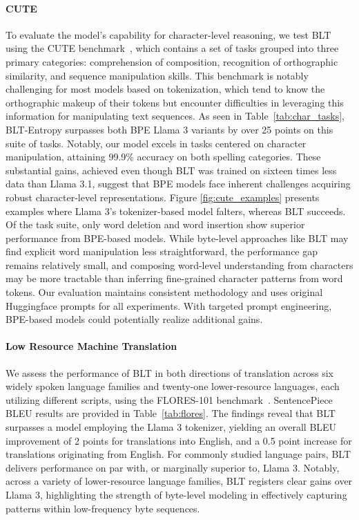\paragraph{CUTE}
To evaluate the model's capability for character-level reasoning, we test {\textsc BLT} using the CUTE benchmark~\citep{edman2024cute}, which contains a set of tasks grouped into three primary categories: comprehension of composition, recognition of orthographic similarity, and sequence manipulation skills. This benchmark is notably challenging for most models based on tokenization, which tend to know the orthographic makeup of their tokens but encounter difficulties in leveraging this information for manipulating text sequences. As seen in Table~\ref{tab:char_tasks}, {\textsc BLT}-Entropy surpasses both BPE Llama 3 variants by over 25 points on this suite of tasks. Notably, our model excels in tasks centered on character manipulation, attaining 99.9\% accuracy on both spelling categories. These substantial gains, achieved even though {\textsc BLT} was trained on sixteen times less data than Llama 3.1, suggest that BPE models face inherent challenges acquiring robust character-level representations. Figure \ref{fig:cute_examples} presents examples where Llama 3's tokenizer-based model falters, whereas {\textsc BLT} succeeds. Of the task suite, only word deletion and word insertion show superior performance from BPE-based models. While byte-level approaches like {\textsc BLT} may find explicit word manipulation less straightforward, the performance gap remains relatively small, and composing word-level understanding from characters may be more tractable than inferring fine-grained character patterns from word tokens. Our evaluation maintains consistent methodology and uses original Huggingface prompts for all experiments. With targeted prompt engineering, BPE-based models could potentially realize additional gains.

\paragraph{Low Resource Machine Translation} We assess the performance of {\textsc BLT} in both directions of translation across six widely spoken language families and twenty-one lower-resource languages, each utilizing different scripts, using the FLORES-101 benchmark~\citep{goyal2022flores}. SentencePiece BLEU results are provided in Table~\ref{tab:flores}. The findings reveal that {\textsc BLT} surpasses a model employing the Llama 3 tokenizer, yielding an overall BLEU improvement of 2 points for translations into English, and a 0.5 point increase for translations originating from English. For commonly studied language pairs, {\textsc BLT} delivers performance on par with, or marginally superior to, Llama 3. Notably, across a variety of lower-resource language families, {\textsc BLT} registers clear gains over Llama 3, highlighting the strength of byte-level modeling in effectively capturing patterns within low-frequency byte sequences.

